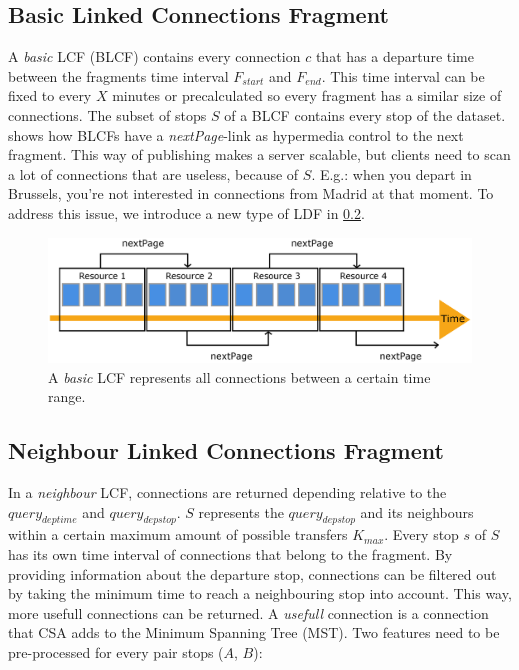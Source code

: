 \documentclass[twocolumn]{phdsymp} %
\begin{document}
\subsection{Basic Linked Connections Fragment}

A \textit{basic} LCF (BLCF) contains every connection $c$ that has a departure time between the fragments time interval $F_{start}$ and $F_{end}$. This time interval can be fixed to every $X$ minutes or precalculated so every fragment has a similar size of connections. The subset of stops $S$ of a BLCF contains every stop of the dataset.  shows how BLCFs have a \textit{nextPage}-link as hypermedia control to the next fragment.
This way of publishing makes a server scalable, but clients need to scan a lot of connections that are useless, because of $S$. E.g.: when you depart in Brussels, you're not interested in connections from Madrid at that moment. To address this issue, we introduce a new type of LDF in \cref{nlcf}.

\begin{figure}[ht]
\begin{center}
	\includegraphics[width=.40\textwidth]{hypermediafragmenten}
	\caption{\label{hypermediafragmenten}A \textit{basic} LCF represents all connections between a certain time range.}
\end{center}
\end{figure}

\subsection{Neighbour Linked Connections Fragment}
\label{nlcf}

In a \textit{neighbour} LCF, connections are returned depending relative to the $query_{deptime}$ and $query_{depstop}$. $S$ represents the $query_{depstop}$ and its neighbours within a certain maximum amount of possible transfers $K_{max}$. Every stop $s$ of $S$ has its own time interval of connections that belong to the fragment.
By providing information about the departure stop, connections can be filtered out by taking the minimum time to reach a neighbouring stop into account. This way, more usefull connections can be returned. A \textit{usefull} connection is a connection that CSA adds to the Minimum Spanning Tree (MST).
Two features need to be pre-processed for every pair stops ($A$, $B$):
\end{document}
